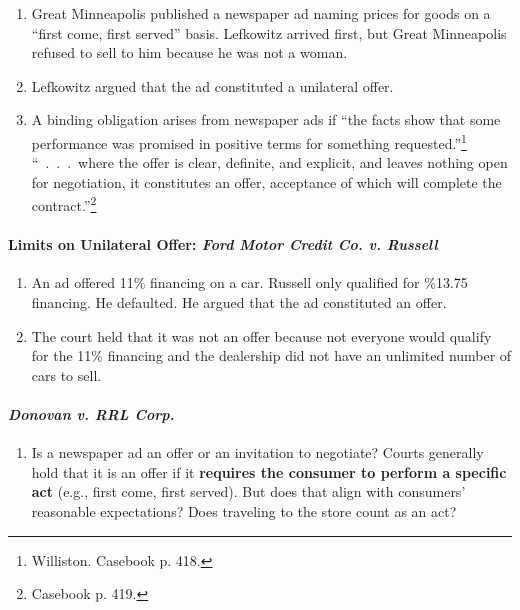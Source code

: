 \begin{enumerate}
    \item Great Minneapolis published a newspaper ad naming prices for goods 
    on a ``first come, first served'' basis. Lefkowitz arrived first, but 
    Great Minneapolis refused to sell to him because he was not a woman.
    \item Lefkowitz argued that the ad constituted a unilateral offer.
    \item A binding obligation arises from newspaper ads if ``the facts show 
    that some performance was promised in positive terms for something 
    requested.''\footnote{Williston. Casebook p.  418.} ``~.~.~.~where the 
    offer is clear, definite, and explicit, and leaves nothing open for 
    negotiation, it constitutes an offer, acceptance of which will complete 
    the contract.''\footnote{Casebook p. 419.}
\end{enumerate}

\paragraph{Limits on Unilateral Offer: \emph{Ford Motor Credit Co. v. 
Russell}}

\begin{enumerate}
    \item An ad offered 11\% financing on a car. Russell only qualified for 
    \%13.75 financing. He defaulted. He argued that the ad constituted an 
    offer.
    \item The court held that it was not an offer because not everyone would 
    qualify for the 11\% financing and the dealership did not have an 
    unlimited number of cars to sell.
\end{enumerate}

\paragraph{\emph{Donovan v. RRL Corp.}}

\begin{enumerate}
    \item Is a newspaper ad an offer or an invitation to negotiate? Courts 
    generally hold that it is an offer if it \textbf{requires the consumer to 
    perform a specific act} (e.g., first come, first served). But does that 
    align with consumers' reasonable expectations? Does traveling to the 
    store count as an act?
\end{enumerate}

